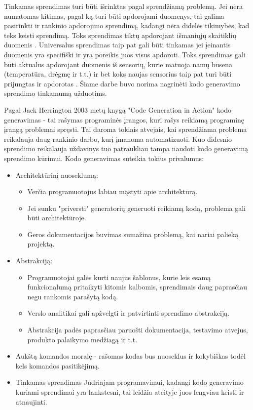 \documentclass{VUMIFPSbakalaurinis}
\begin{document}
Tinkamas sprendimas turi būti išrinktas pagal sprendžiamą problemą. Jei nėra numatomas kitimas, pagal ką turi būti apdorojami duomenys, tai galima pasirinkti ir rankinio apdorojimo sprendimą, kadangi nėra didelės tikimybės, kad teks keisti sprendimą. Toks sprendimas tiktų apdorojant išmaniųjų skaitiklių duomenis \cite{skaitikliai}. Universalus sprendimas taip pat gali būti tinkamas jei įeinantis duomenis yra specifiški ir yra poreikis juos visus apdoroti. Toks sprendimas gali būti aktualus apdorojant duomenis iš sensorių, kurie matuoja namų būsena (temperatūra, drėgmę ir t.t.) ir bet koks naujas sensorius taip pat turi būti prijungtas ir apdorotas \cite{yang2017iot}. Šiame darbe buvo norima nagrinėti kodo generavimo sprendimo tinkamumą užduotims. \par
Pagal Jack Herrington 2003 metų knygą "Code Generation in Action" kodo generavimas - tai rašymas programinės įrangos, kuri rašys reikiamą programinę įrangą problemai spręsti. Tai daroma tokiais atvejais, kai sprendžiama problema reikalauja daug rankinio darbo, kurį įmanoma automatizuoti. Kuo didesnio sprendimo reikalauja uždavinys tuo patraukliau tampa naudoti kodo generavimą sprendimo kūrimui. Kodo generavimas suteikia tokius privalumus: 
\begin{itemize}
    \item Architektūrinį nuoseklumą: 
    \begin{itemize}
        \item Verčia programuotojus labiau mąstyti apie architektūrą.
        \item Jei sunku "priversti" generatorių generuoti reikiamą kodą, problema gali būti architektūroje.
        \item Geros dokumentacijos buvimas sumažina problemą, kai nariai palieką projektą.
    \end{itemize}
    \item Abstrakciją:
    \begin{itemize}
        \item Programuotojai galės kurti naujus šablonus, kurie leis esamą funkcionalumą pritaikyti kitomis kalbomis, sprendimais daug paprasčiau negu rankomis parašytą kodą.
        \item Verslo analitikai gali apžvelgti ir patvirtinti sprendimo abstrakciją.
        \item Abstrakcija padės paprasčiau paruošti dokumentacija, testavimo atvejus, produkto palaikymo medžiagą ir t.t.  
    \end{itemize}
    \item Aukštą komandos moralę - rašomas kodas bus nuoseklus ir kokybiškas todėl kels komandos pasitikėjimą.
    \item Tinkamas sprendimas Judriajam programavimui, kadangi kodo generavimo kuriami sprendimai yra lankstesni, tai leidžia ateityje juos lengviau keisti ir atnaujinti.   
\end{itemize} 
\end{document}
